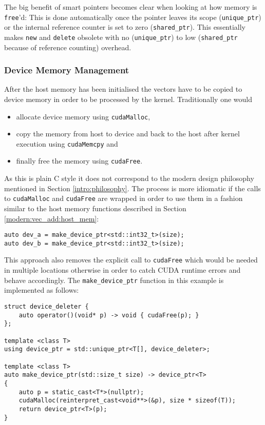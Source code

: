 \noindent The big benefit of smart pointers becomes clear when looking at how memory is \texttt{free}'d: This is done automatically once the pointer leaves its scope (\texttt{unique\_ptr}) or the internal reference counter is set to zero (\texttt{shared\_ptr}). This essentially makes \texttt{new} and \texttt{delete} obsolete with no (\texttt{unique\_ptr}) to low (\texttt{shared\_ptr} because of reference counting) overhead.

\subsubsection{Device Memory Management}\label{modern:vec_add:dev_mem}

After the host memory has been initialised the vectors have to be copied to device memory in order to be processed by the kernel. Traditionally one would

\begin{itemize}
\item allocate device memory using \texttt{cudaMalloc},
\item copy the memory from host to device and back to the host after kernel execution using \texttt{cudaMemcpy} and
\item finally free the memory using \texttt{cudaFree}.
\end{itemize}

\noindent As this is plain C style it does not correspond to the modern design philosophy mentioned in Section \ref{intro:philosophy}. The process is more idiomatic if the calls to \texttt{cudaMalloc} and \texttt{cudaFree} are wrapped in order to use them in a fashion similar to the host memory functions described in Section \ref{modern:vec_add:host_mem}:

\begin{verbatim}
auto dev_a = make_device_ptr<std::int32_t>(size);
auto dev_b = make_device_ptr<std::int32_t>(size);
\end{verbatim}

\noindent This approach also removes the explicit call to \texttt{cudaFree} which would be needed in multiple locations otherwise in order to catch CUDA runtime errors and behave accordingly. The \texttt{make\_device\_ptr} function in this example is implemented as follows:

\begin{verbatim}
struct device_deleter { 
    auto operator()(void* p) -> void { cudaFree(p); }
};

template <class T>
using device_ptr = std::unique_ptr<T[], device_deleter>;

template <class T>
auto make_device_ptr(std::size_t size) -> device_ptr<T>
{
    auto p = static_cast<T*>(nullptr);
    cudaMalloc(reinterpret_cast<void**>(&p), size * sizeof(T));
    return device_ptr<T>(p);
}
\end{verbatim}


